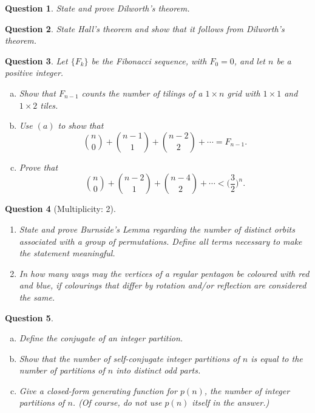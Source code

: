 \documentclass[12]{article}
\newtheorem{question}{Question}
\theoremstyle{definition}
\begin{document}
	\begin{question}
		State and prove Dilworth's theorem.
	\end{question}

	\begin{question}
		State Hall's theorem and show that it follows from Dilworth's theorem.
	\end{question}

	\newpage
	
	\begin{question}
		Let $\{F_k\}$ be the Fibonacci sequence, with $F_0 = 0$, and let $n$ be a positive integer.
		\begin{enumerate}[a)]
			\item Show that $F_{n-1}$ counts the number of tilings of a $1 \times n$ grid with $1 \times 1$ and $1 \times 2$ tiles.
			\item Use $(a)$ to show that
			$${n \choose 0} + {n-1 \choose 1} + {n-2 \choose 2} + \cdots = F_{n-1}.$$
			\item Prove that
			$${n \choose 0} + {n-2 \choose 1} + {n - 4 \choose 2} + \cdots < \biggr(\frac{3}{2}\biggr)^n.$$
		\end{enumerate}
	\end{question}

	\begin{question}[Multiplicity: 2]
		\
		\begin{enumerate}
			\item State and prove Burnside's Lemma regarding the number of distinct orbits associated with a group of permutations.  Define all terms necessary to make the statement meaningful.
			\item In how many ways may the vertices of a regular pentagon be coloured with red and blue, if colourings that differ by rotation and/or reflection are considered the same.
		\end{enumerate}
	\end{question}

	\begin{question}
		\
		\begin{enumerate}[a)]
			\item Define the conjugate of an integer partition.
			\item Show that the number of self-conjugate integer partitions of $n$ is equal to the number of partitions of $n$ into distinct odd parts.
			\item Give a closed-form generating function for $p(n)$, the number of integer partitions of $n$.  (Of course, do not use $p(n)$ itself in the answer.)
		\end{enumerate}
	\end{question}
\end{document}
